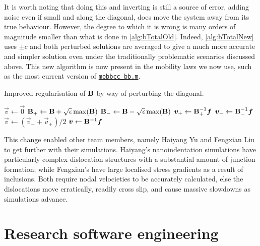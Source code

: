 It is worth noting that doing this and inverting is still a source of error, adding noise even if small and along the diagonal, does move the system away from its true behaviour. However, the degree to which it is wrong is many orders of magnitude smaller than what is done in \cref{alg:bTotalOld}. Indeed, \cref{alg:bTotalNew} uses $\pm c $ and both perturbed solutions are averaged to give a much more accurate and simpler solution even under the traditionally problematic scenarios discussed above. This new algorithm is now present in the mobility laws we now use, such as the most current version of \href{https://github.com/TarletonGroup/EasyDD/blob/372984499dd60136fc7badabd6cee192058d55d9/src/mobbcc_bb1b.m#L199}{\texttt{mobbcc\_bb.m}}.
\begin{algorithm}
    \caption[Dampening the drag matrix inversion singularity.]{Improved regularisation of $\mathbf{B}$ by way of perturbing the diagonal.}
    \label{alg:bTotalNew}
    \begin{algorithmic}
        \State $\vec{v} \gets \vec{0}$
        \State $\mathbf{B}_+ \gets \mathbf{B} + \sqrt{\epsilon} \max(\mathbf{B})$
        \State $\mathbf{B}_- \gets \mathbf{B} - \sqrt{\epsilon} \max(\mathbf{B})$
        \State $\vec{v}_+ \gets \mtx{B}_+^{-1} \vec{f}$
        \State $\vec{v}_- \gets \mtx{B}_-^{-1} \vec{f}$
        \State $\vec{v} \gets (\vec{v}_- + \vec{v}_+)/2$
        \Else
        \State $\vec{v} \gets \mtx{B}^{-1} \vec{f}$
        \EndIf
    \end{algorithmic}
\end{algorithm}

This change enabled other team members, namely Haiyang Yu and Fengxian Liu to get further with their simulations. Haiyang's nanoindentation simulations have particularly complex dislocation structures with a substantial amount of junction formation; while Fengxian's have large localised stress gradients as a result of inclusions. Both require nodal velocieties to be accurately calculated, else the dislocations move erratically, readily cross slip, and cause massive slowdowns as simulations advance.

\section{Research software engineering}
\label{s:rse}

